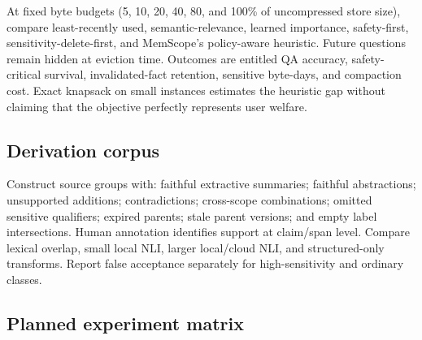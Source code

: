 At fixed byte budgets (5, 10, 20, 40, 80, and 100\% of uncompressed store size), compare least-recently used, semantic-relevance, learned importance, safety-first, sensitivity-delete-first, and MemScope's policy-aware heuristic. Future questions remain hidden at eviction time. Outcomes are entitled QA accuracy, safety-critical survival, invalidated-fact retention, sensitive byte-days, and compaction cost. Exact knapsack on small instances estimates the heuristic gap without claiming that the objective perfectly represents user welfare.

\subsection{Derivation corpus}

Construct source groups with: faithful extractive summaries; faithful abstractions; unsupported additions; contradictions; cross-scope combinations; omitted sensitive qualifiers; expired parents; stale parent versions; and empty label intersections. Human annotation identifies support at claim/span level. Compare lexical overlap, small local NLI, larger local/cloud NLI, and structured-only transforms. Report false acceptance separately for high-sensitivity and ordinary classes.

\subsection{Planned experiment matrix}

